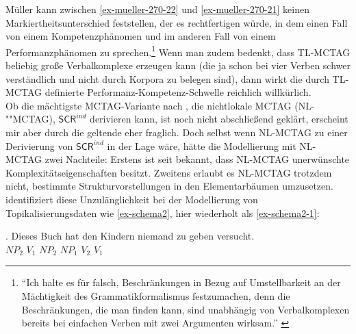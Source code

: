 Müller kann zwischen \ref{ex-mueller-270-22} und \ref{ex-mueller-270-21} keinen Markiertheitsunterschied feststellen, der es rechtfertigen würde, in dem einen Fall von einem Kompetenzphänomen und im anderen Fall von einem Performanzphänomen zu sprechen.\footnote{"`Ich halte es für falsch, Beschränkungen in Bezug auf Umstellbarkeit an der Mächtigkeit des Grammatikformalismus festzumachen, denn die Beschränkungen, die man finden kann, sind unabhängig von Verbalkomplexen bereits bei einfachen Verben mit zwei Argumenten wirksam."' \citep[269]{Mueller:10}} Wenn man zudem bedenkt, dass TL-MCTAG beliebig gro\ss e Verbalkomplexe erzeugen kann (die ja schon bei vier Verben schwer verständlich und nicht durch Korpora zu belegen sind), dann wirkt die durch TL-MCTAG definierte Performanz-Kompetenz-Schwelle reichlich willkürlich. \\

Ob die mächtigste MCTAG-Variante nach \cite{Weir:88}, die nichtlokale MCTAG (NL-""MCTAG), $\mathsf{SCR}^{ind}$ derivieren kann, ist noch nicht abschlie\ss end geklärt, erscheint mir aber durch die geltende  eher fraglich. Doch selbst wenn NL-MCTAG zu einer Derivierung von $\mathsf{SCR}^{ind}$ in der Lage wäre, hätte die Modellierung mit NL-MCTAG zwei Nachteile: Erstens ist seit \cite{Rambow:Satta:92} bekannt, dass NL-MCTAG unerwünschte Komplexitätseigenschaften besitzt. Zweitens erlaubt es NL-MCTAG trotzdem nicht, bestimmte Strukturvorstellungen in den Elementarbäumen umzusetzen. \citet[56f]{Rambow:94} identifiziert diese Unzulänglichkeit bei der Modellierung von Topikalisierungsdaten wie \ref{ex-schema2}, hier wiederholt als \ref{ex-schema2-1}:

\exg. {Dieses Buch} hat {den Kindern} niemand {zu geben} versucht.  \\
$\mathit{NP}_2$ $V_1$ $\mathit{NP}_2$ $\mathit{NP}_1$ $V_2$ $V_1$ \\
\citep[42]{Rambow:94} \label{ex-schema2-1}


